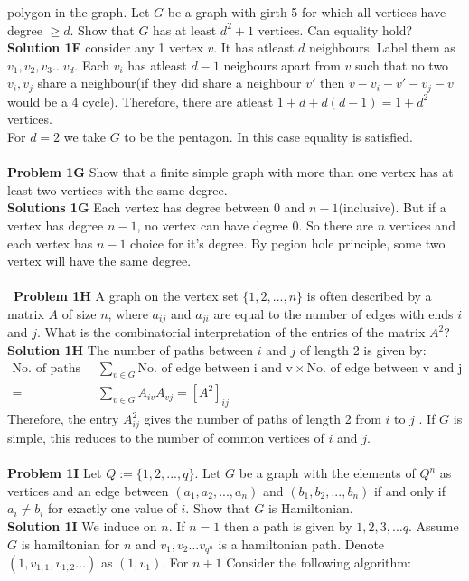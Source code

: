 \documentclass{book}
\begin{document}
polygon in the graph. Let $G$ be a graph with girth 5 for which all
vertices have degree $\geq d$. Show that $G$ has at least $d^2 + 1$ vertices.
Can equality hold? \\
\textbf{Solution 1F} consider any 1 vertex $v$. It has atleast $d$ neighbours. Label them as $v_1,v_2,v_3\hdots v_d$. Each $v_i$ has atleast $d-1$ neigbours apart from $v$ such that no two $v_i,v_j$ share a neighbour(if they did share a neighbour $v'$ then $v-v_i-v'-v_j-v$ would be a 4 cycle). Therefore, there are atleast $1+d+d(d-1)=1+d^2$ vertices.\\
For $d=2$ we take $G$ to be the pentagon. In this case equality is satisfied.\\\\
\textbf{Problem 1G} Show that a finite simple graph with more than one
vertex has at least two vertices with the same degree.  \\
\textbf{Solutions 1G} Each vertex has degree between $0$ and $n-1$(inclusive). But if a vertex has degree $n-1$, no vertex can have degree $0$. So there are $n$ vertices and each vertex has $n-1$ choice for it's degree. By pegion hole principle, some two vertex will have the same degree.              \\\\\
\textbf{Problem 1H} A graph on the vertex set $\{1, 2,...,n\}$ is often described by a matrix $A$ of size $n$, where $a_{ij}$ and $a_{ji}$ are equal to
the number of edges with ends $i$ and $j$. What is the combinatorial
interpretation of the entries of the matrix $A^2$?\\
\textbf{Solution 1H} The number of paths between $i$ and $j$ of length 2 is given by:
\begin{align*}
    \text{No. of paths :}&\sum_{v\in G}\text{No. of edge between i and v}\times \text{No. of edge between v and j}\\
    =&\sum_{v\in G}A_{iv}A_{vj}=[A^2]_{ij}
\end{align*}
Therefore, the entry $A^2_{ij}$ gives the number of paths of length 2 from $i$ to $j$ . If $G$ is simple, this reduces to the number of common vertices of $i$ and $j$.\\\\
\textbf{Problem 1I}  Let $Q :=\{1, 2,...,q\}$. Let $G$ be a graph with the
elements of $Q^n$ as vertices and an edge between $(a_1, a_2,...,a_n)$ and
$(b_1, b_2,...,b_n)$ if and only if $a_i \ne b_i$ for exactly one value of $i$. Show
that $G$ is Hamiltonian. \\
\textbf{Solution 1I} We induce on $n$. If $n=1$ then a path is given by $1,2,3,\hdots q$. Assume $G$ is hamiltonian for $n$ and $v_1,v_2\hdots v_{q^n}$ is a hamiltonian path. Denote $(1,v_{1,1},v_{1,2}\hdots)$ as $(1,v_1)$. For $n+1$ Consider the following algorithm:
\end{document}
